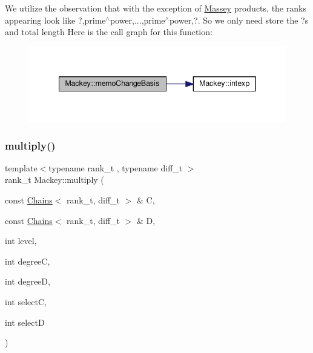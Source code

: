 We utilize the observation that with the exception of \hyperlink{classMackey_1_1Massey}{Massey} products, the ranks appearing look like ?,prime$^\wedge$power,...,prime$^\wedge$power,?. So we only need store the ?\textquotesingle{}s and total length Here is the call graph for this function\+:\nopagebreak
\begin{figure}[H]
\begin{center}
\leavevmode
\includegraphics[width=342pt]{namespaceMackey_a70952d513d08b47bc282441a3e9d732c_cgraph}
\end{center}
\end{figure}
\mbox{\label{namespaceMackey_a80dbde3a859378ede596b48869ec50d9}} 
\subsubsection{\texorpdfstring{multiply()}{multiply()}\hspace{0.1cm}{\footnotesize\ttfamily [1/2]}}
{\footnotesize\ttfamily template$<$typename rank\+\_\+t , typename diff\+\_\+t $>$ \\
rank\+\_\+t Mackey\+::multiply (\begin{DoxyParamCaption}\item[{const \hyperlink{classMackey_1_1Chains}{Chains}$<$ rank\+\_\+t, diff\+\_\+t $>$ \&}]{C,  }\item[{const \hyperlink{classMackey_1_1Chains}{Chains}$<$ rank\+\_\+t, diff\+\_\+t $>$ \&}]{D,  }\item[{int}]{level,  }\item[{int}]{degreeC,  }\item[{int}]{degreeD,  }\item[{int}]{selectC,  }\item[{int}]{selectD }\end{DoxyParamCaption})}

